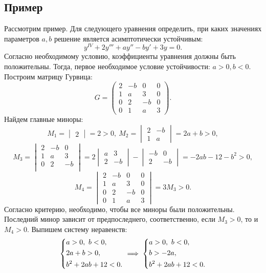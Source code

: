 	\subsection{Пример}

		Рассмотрим пример. Для следующего уравнения определить, при каких значениях параметров $a, b$ решение является асимптотически устойчивым:
		\[ y^{IV} + 2y''' + a y'' - by' + 3y = 0. \]
		Согласно необходимому условию, коэффициенты уравнения должны быть положительны. Тогда, первое необходимое условие устойчивости: $a > 0, b < 0$. Построим матрицу Гурвица:
		\[ G = \begin{pmatrix}
			2 & -b & 0 & 0 \\
			1 & a & 3 & 0 \\
			0 & 2 & -b & 0 \\
			0 & 1 & a & 3
		\end{pmatrix}. \]
		Найдем главные миноры:
		\[ M_1 = \begin{vmatrix} 2 \end{vmatrix} = 2 > 0, ~ M_2 = \begin{vmatrix} 2 & -b \\ 1 & a \end{vmatrix} = 2a + b > 0, \]
		\[ M_3 = \begin{vmatrix}  
			2 & -b & 0 \\
			1 & a & 3 \\
			0 & 2 & -b \\
		\end{vmatrix} = 2 \begin{vmatrix} a & 3 \\ 2 & -b \end{vmatrix} - \begin{vmatrix} -b & 0 \\ 2 & -b \end{vmatrix} = -2ab - 12 - b^2 > 0, \]
		\[ M_4 = \begin{vmatrix}
			2 & -b & 0 & 0 \\
			1 & a & 3 & 0 \\
			0 & 2 & -b & 0 \\
			0 & 1 & a & 3
		\end{vmatrix} = 3M_3 > 0. \]
		Согласно критерию, необходимо, чтобы все миноры были положительны. Последний минор зависит от предпоследнего, соответственно, если $M_3 > 0$, то и $M_4 > 0$. Выпишем систему неравенств:
		\[ \left\lbrace \begin{aligned} 
			&a > 0, ~ b < 0, \\
			& 2a + b > 0, \\
			&b^2 + 2ab + 12 < 0.
		 \end{aligned} \right. \implies \left\lbrace \begin{aligned} 
			&a > 0, ~ b < 0, \\
			&b > -2a, \\
			&b^2 + 2ab + 12 < 0.
		 \end{aligned} \right. \]
